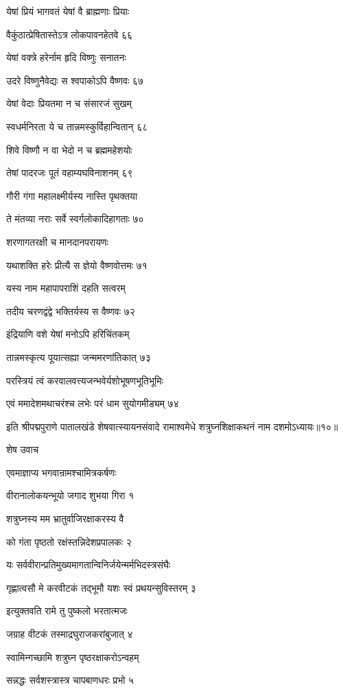 येषां प्रियं भागवतं येषां वै ब्राह्मणाः प्रियाः

वैकुंठात्प्रेषितास्तेऽत्र लोकपावनहेतवे ६६

येषां वक्त्रे हरेर्नाम हृदि विष्णुः सनातनः

उदरे विष्णुनैवेद्यः स श्वपाकोऽपि वैष्णवः ६७

येषां वेदाः प्रियतमा न च संसारजं सुखम्

स्वधर्मनिरता ये च तान्नमस्कुर्विहान्वितान् ६८

शिवे विष्णौ न वा भेदो न च ब्रह्ममहेशयोः

तेषां पादरजः पूतं वहाम्यघविनाशनम् ६९

गौरी गंगा महालक्ष्मीर्यस्य नास्ति पृथक्तया

ते मंतव्या नराः सर्वे स्वर्गलोकादिहागताः ७०

शरणागतरक्षी च मानदानपरायणः

यथाशक्ति हरेः प्रीत्यै स ज्ञेयो वैष्णवोत्तमः ७१

यस्य नाम महापापराशिं दहति सत्वरम्

तदीय चरणद्वंद्वे भक्तिर्यस्य स वैष्णवः ७२

इंद्रियाणि वशे येषां मनोऽपि हरिचिंतकम्

तान्नमस्कृत्य पूयात्सह्या जन्ममरणांतिकात् ७३

परस्त्रियं त्वं करवालवत्त्यजन्भवेर्यशोभूषणभूतिभूमिः

एवं ममादेशमथाचरंश्च लभेः परं धाम सुयोगमीड्यम् ७४

इति श्रीपद्मपुराणे पातालखंडे शेषवात्स्यायनसंवादे रामाश्वमेधे शत्रुघ्नशिक्षाकथनं नाम दशमोऽध्यायः॥१०॥


शेष उवाच

एवमाज्ञाप्य भगवान्रामश्चामित्रकर्षणः

वीरानालोकयन्भूयो जगाद शुभया गिरा १

शत्रुघ्नस्य मम भ्रातुर्वाजिरक्षाकरस्य वै

को गंता पृष्ठतो रक्षंस्तन्निदेशप्रपालकः २

यः सर्ववीरान्प्रतिमुख्यमागतान्विनिर्जयेन्मर्मभिदस्त्रसंघैः

गृह्णात्वसौ मे करवीटकं तद्भूमौ यशः स्वं प्रथयन्सुविस्तरम् ३

इत्युक्तवति रामे तु पुष्कलो भरतात्मजः

जग्राह वीटकं तस्माद्रघुराजकरांबुजात् ४

स्वामिन्गच्छामि शत्रुघ्न पृष्ठरक्षाकरोऽन्वहम्

सन्नद्धः सर्वशस्त्रास्त्र चापबाणधरः प्रभो ५

